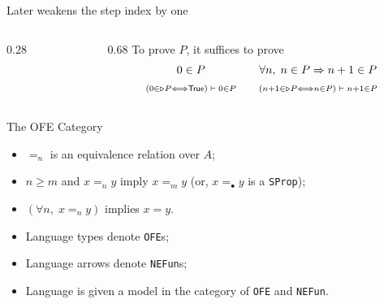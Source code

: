 \documentclass[10pt,aspectratio=169]{beamer}
\begin{document}
\begin{frame}{Later weakens the step index by one}
  \par\vspace{0.10em}

  \vspace{0.10cm}

  \vspace{0.10cm}
  \begin{columns}[c,onlytextwidth]
    \begin{column}{0.28\textwidth}
    \end{column}
    \begin{column}{0.68\textwidth}
      \small To prove $P$, it suffices to prove
      \[
        \begin{array}{c@{\qquad}c}
          0\in P
            & \forall n,\;n\in P\Rightarrow n+1\in P \\[0.35em]
          \scriptstyle
          (0\in\Later P\Longleftrightarrow\true)\;\Entails\;0\in P
            & \scriptstyle
          (n+1\in\Later P\Longleftrightarrow n\in P)\;\Entails\;n+1\in P
        \end{array}
      \]
    \end{column}
  \end{columns}

  \vfill
  \scriptsize{}
\end{frame}

\begin{frame}{The OFE Category}
  \begin{itemize}
    \item $=_n$ is an equivalence relation over $A$;
    \item $n\ge m$ and $x=_n y$ imply $x=_m y$ (or, $x=_\bullet y$ is a \texttt{SProp});
    \item $(\forall n,\; x =_n y)$ implies $x = y$.
  \end{itemize}


  \begin{itemize}
    \item Language types denote \texttt{OFE}s;
    \item Language arrows denote \texttt{NEFun}s;
    \item Language is given a model in the category of \texttt{OFE} and \texttt{NEFun}.
  \end{itemize}
\end{frame}
\end{document}
